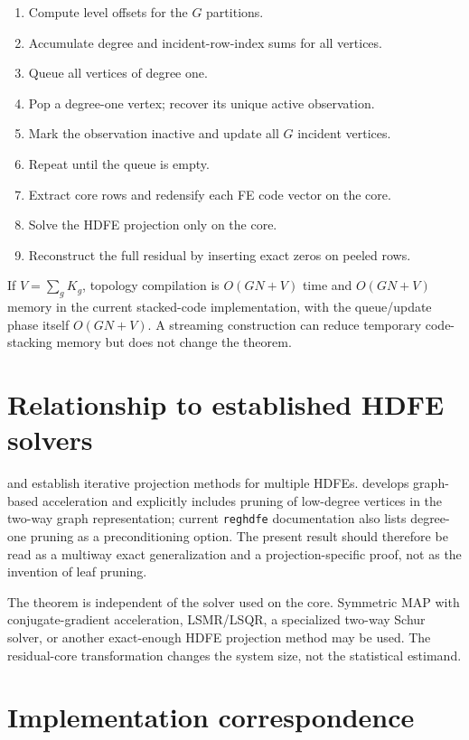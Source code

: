 \documentclass[11pt]{article}
\theoremstyle{definition}
\newcommand{\1}{\mathbf{1}}
\begin{document}
\begin{enumerate}[label=\arabic*.]
  \item Compute level offsets for the $G$ partitions.
  \item Accumulate degree and incident-row-index sums for all vertices.
  \item Queue all vertices of degree one.
  \item Pop a degree-one vertex; recover its unique active observation.
  \item Mark the observation inactive and update all $G$ incident vertices.
  \item Repeat until the queue is empty.
  \item Extract core rows and redensify each FE code vector on the core.
  \item Solve the HDFE projection only on the core.
  \item Reconstruct the full residual by inserting exact zeros on peeled rows.
\end{enumerate}

If $V=\sum_g K_g$, topology compilation is $O(GN+V)$ time and $O(GN+V)$ memory in the current stacked-code implementation, with the queue/update phase itself $O(GN+V)$. A streaming construction can reduce temporary code-stacking memory but does not change the theorem.

\section{Relationship to established HDFE solvers}

\citet{GuimaraesPortugal2010} and \citet{Gaure2013} establish iterative projection methods for multiple HDFEs. \citet{Correia2017} develops graph-based acceleration and explicitly includes pruning of low-degree vertices in the two-way graph representation; current \texttt{reghdfe} documentation also lists degree-one pruning as a preconditioning option. The present result should therefore be read as a multiway exact generalization and a projection-specific proof, not as the invention of leaf pruning.

The theorem is independent of the solver used on the core. Symmetric MAP with conjugate-gradient acceleration, LSMR/LSQR, a specialized two-way Schur solver, or another exact-enough HDFE projection method may be used. The residual-core transformation changes the system size, not the statistical estimand.

\section{Implementation correspondence}
\end{document}
